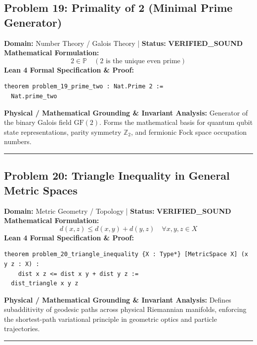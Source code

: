 \documentclass[10pt,a4paper]{article}
\begin{document}
\subsection*{Problem 19: Primality of 2 (Minimal Prime Generator)}
\textbf{Domain:} Number Theory / Galois Theory \quad | \quad \textbf{Status:} \textcolor{green!70!black}{\textbf{VERIFIED\_SOUND}}\\
\textbf{Mathematical Formulation:}
\begin{equation*}
  2 \in \mathbb{P} \quad (2 \text{ is the unique even prime})
\end{equation*}
\textbf{Lean 4 Formal Specification \& Proof:}
\begin{lstlisting}
theorem problem_19_prime_two : Nat.Prime 2 :=
  Nat.prime_two
\end{lstlisting}
\textbf{Physical / Mathematical Grounding \& Invariant Analysis:}
Generator of the binary Galois field $\mathrm{GF}(2)$. Forms the mathematical basis for quantum qubit state representations, parity symmetry $\mathbb{Z}_2$, and fermionic Fock space occupation numbers.
\vspace{0.8em}\hrule\vspace{0.8em}
\subsection*{Problem 20: Triangle Inequality in General Metric Spaces}
\textbf{Domain:} Metric Geometry / Topology \quad | \quad \textbf{Status:} \textcolor{green!70!black}{\textbf{VERIFIED\_SOUND}}\\
\textbf{Mathematical Formulation:}
\begin{equation*}
  d(x, z) \le d(x, y) + d(y, z) \quad \forall x, y, z \in X
\end{equation*}
\textbf{Lean 4 Formal Specification \& Proof:}
\begin{lstlisting}
theorem problem_20_triangle_inequality {X : Type*} [MetricSpace X] (x y z : X) : 
    dist x z <= dist x y + dist y z :=
  dist_triangle x y z
\end{lstlisting}
\textbf{Physical / Mathematical Grounding \& Invariant Analysis:}
Defines subadditivity of geodesic paths across physical Riemannian manifolds, enforcing the shortest-path variational principle in geometric optics and particle trajectories.
\vspace{0.8em}\hrule\vspace{0.8em}
\end{document}
